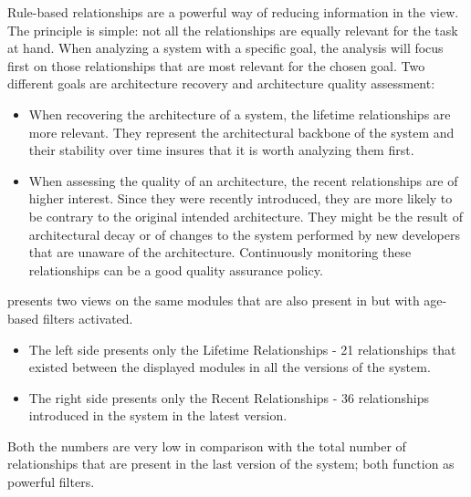 \documentclass[preprint,12pt]{elsarticle}
\begin{document}
Rule-based relationships are a powerful way of reducing information in the view. The principle is simple: not all the relationships are equally relevant for the task at hand. When analyzing a system with a specific goal, the analysis will focus first on those relationships that are most relevant for the chosen goal. Two different goals are architecture recovery and architecture quality assessment: 

\begin{itemize}
\item When recovering the architecture of a system, the lifetime relationships are more relevant. They represent the architectural backbone of the system and their stability over time insures that it is worth analyzing them first.

\item When assessing the quality of an architecture, the recent relationships are of higher interest. Since they were recently introduced, they are more likely to be contrary to the original intended architecture. They might be the result of architectural decay or of changes to the system performed by new developers that are unaware of the architecture. Continuously monitoring these relationships can be a good quality assurance policy.
\end{itemize}

 presents two views on the same modules that are also present in  but with age-based filters activated. 

\begin{itemize}
\item 
The left side presents only the Lifetime Relationships - 21 relationships that existed between the displayed modules in all the versions of the system. 
\item The right side presents only the Recent Relationships - 36 relationships introduced in the system in the latest version. 
\end{itemize}

Both the numbers are very low in comparison with the total number of relationships that are present in the last version of the system; both function as powerful filters.
\end{document}
